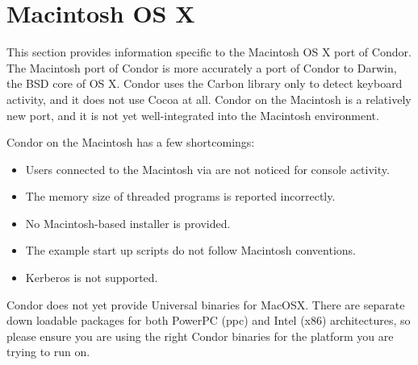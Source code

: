 \section{\label{sec:platform-macos}Macintosh OS X}

This section provides information specific to the Macintosh OS X port of
Condor.
The Macintosh port of Condor is more accurately a port of Condor to
Darwin, the BSD core of OS X. Condor uses the Carbon library only to
detect keyboard activity, and it does not use Cocoa at all.
Condor on the Macintosh is a relatively new port, and it 
is not yet well-integrated
into the Macintosh environment. 

Condor on the Macintosh has a few shortcomings:
\begin{itemize}
\item Users connected to the Macintosh via  are not
noticed for console activity.
\item The memory size of threaded programs is reported incorrectly.
\item No Macintosh-based installer is provided.
\item The example start up scripts do not follow Macintosh conventions.
\item Kerberos is not supported.
\end{itemize}


Condor does not yet provide Universal binaries for MacOSX.
There are separate down loadable packages for both PowerPC (ppc) and
Intel (x86) architectures, so please ensure you are using the right
Condor binaries for the platform you are trying to run on.
